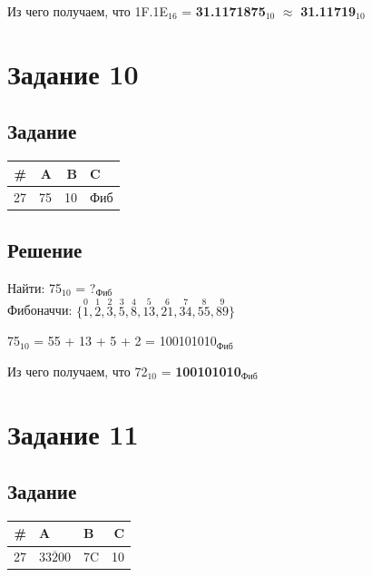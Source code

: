 \documentclass[11pt]{article}
\begin{document}
Из чего получаем, что 1F.1E\(_{\text{16}}\) = \textbf{31.1171875\(_{\text{10}}\)} \(\approx\) \textbf{31.11719\(_{\text{10}}\)}

\section{Задание 10}
\label{sec:org14a22f5}
\subsection{Задание}
\label{sec:orgf1bbc08}
\begin{center}
\begin{tabular}{|r|rrl|}
\hline
\# & A & B & C\\
\hline
27 & 75 & 10 & Фиб\\
\hline
\end{tabular}
\end{center}

\subsection{Решение}
\label{sec:org1bcc5f9}
Найти: 75\(_{\text{10}}\) = ?\(_{\text{Фиб}}\) \\
Фибоначчи: \(\{\overset{0}{1}, \overset{1}{2}, \overset{2}{3}, \overset{3}{5}, \overset{4}{8},
\overset{5}{13}, \overset{6}{21}, \overset{7}{34}, \overset{8}{55}, \overset{9}{89}\}\) \\
\begin{center}
75\(_{\text{10}}\) = 55 + 13 + 5 + 2 = 100101010\(_{\text{Фиб}}\)
\end{center}

Из чего получаем, что 72\(_{\text{10}}\) = \textbf{100101010\(_{\text{Фиб}}\)}

\section{Задание 11}
\label{sec:org58ad7ed}
\subsection{Задание}
\label{sec:org4e4231a}
\begin{center}
\begin{tabular}{|r|llr|}
\hline
\# & A & B & C\\
\hline
27 & \(33\overline{2}00\) & 7C & 10\\
\hline
\end{tabular}
\end{center}
\end{document}
